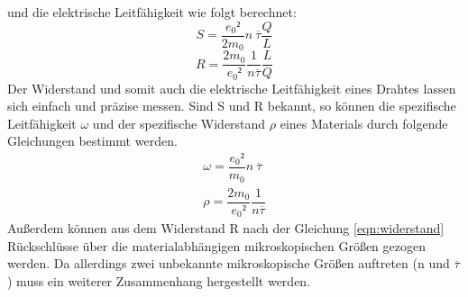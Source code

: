     und die elektrische Leitfähigkeit wie folgt berechnet:
    \begin{equation}
        \label{eqn:leitfähigkeit}
        S=\dfrac{e_0²}{2 m_0}n\ \overline \tau \dfrac{Q}{L}
    \end{equation}
    \begin{equation}
        \label{eqn:widerstand}
        R=\dfrac{2m_0}{e_0²} \dfrac{1}{n \overline \tau} \dfrac{L}{Q}
    \end{equation}
    Der Widerstand und somit auch die elektrische Leitfähigkeit eines Drahtes
    lassen sich einfach und präzise messen. Sind S und R bekannt, so können 
    die spezifische Leitfähigkeit $\omega$ und der spezifische Widerstand $\rho$ 
    eines Materials durch folgende Gleichungen bestimmt werden. 
    \begin{align}
        \omega= \dfrac{e_0²}{m_0}n\ \overline \tau \\
        \rho = \dfrac{2m_0}{e_0²} \dfrac{1}{n \overline \tau}
    \end{align}
    Außerdem können aus dem Widerstand R nach der Gleichung \eqref{eqn:widerstand} 
    Rückschlüsse über die materialabhängigen mikroskopischen Größen gezogen werden.
    Da allerdings zwei unbekannte mikroskopische Größen auftreten (n und $\overline \tau$)
    muss ein weiterer Zusammenhang hergestellt werden.
